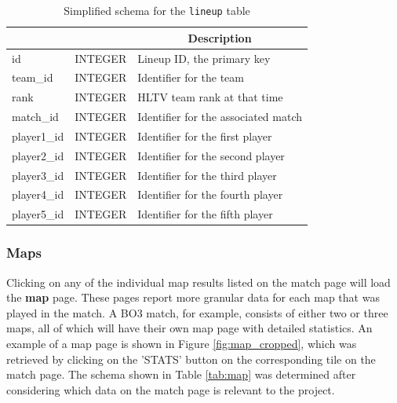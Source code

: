 \begin{table}[h!]
	\centering
	\caption{Simplified schema for the \texttt{lineup} table}
	\renewcommand{\arraystretch}{1.2} %
	\begin{tabular}{|>{\ttfamily}l|>{\ttfamily}c|l|}
		\hline
		\multicolumn{1}{|c|}{\textnormal{\textbf{Field}}} & \multicolumn{1}{c|}{\textnormal{\textbf{Type}}} & \multicolumn{1}{c|}{\textbf{Description}} \\
		\hline
		id & INTEGER & Lineup ID, the primary key \\
		\hline
		team\_id & INTEGER & Identifier for the team \\
		\hline
		rank & INTEGER & HLTV team rank at that time \\
		\hline
		match\_id & INTEGER & Identifier for the associated match \\
		\hline
		player1\_id & INTEGER & Identifier for the first player \\
		\hline
		player2\_id & INTEGER & Identifier for the second player \\
		\hline
		player3\_id & INTEGER & Identifier for the third player \\
		\hline
		player4\_id & INTEGER & Identifier for the fourth player \\
		\hline
		player5\_id & INTEGER & Identifier for the fifth player \\
		\hline
	\end{tabular}
	\label{tab:lineup}
\end{table}

\clearpage

\subsubsection{Maps}

\label{maps}

Clicking on any of the individual map results listed on the match page will load the \textbf{map} page. These pages report more granular data for  each map that was played in the match. A BO3 match, for example, consists of either two or three maps, all of which will have their own map page with detailed statistics. An example of a map page is shown in Figure \ref{fig:map_cropped}, which was retrieved by clicking on the 'STATS' button on the corresponding tile on the match page. The schema shown in Table \ref{tab:map} was determined after considering which data on the match page is relevant to the project.

